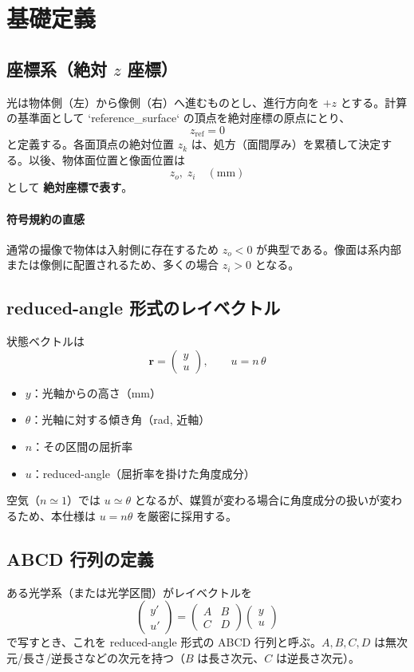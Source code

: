 \section{基礎定義}

\subsection{座標系（絶対 $z$ 座標）}
光は物体側（左）から像側（右）へ進むものとし、進行方向を $+z$ とする。計算の基準面として `reference_surface` の頂点を絶対座標の原点にとり、
\[
z_{\mathrm{ref}} = 0
\]
と定義する。各面頂点の絶対位置 $z_k$ は、処方（面間厚み）を累積して決定する。以後、物体面位置と像面位置は
\[
z_o,\; z_i \quad (\mathrm{mm})
\]
として \textbf{絶対座標で表す}。

\paragraph{符号規約の直感}
通常の撮像で物体は入射側に存在するため $z_o < 0$ が典型である。像面は系内部または像側に配置されるため、多くの場合 $z_i > 0$ となる。

\subsection{reduced-angle 形式のレイベクトル}
状態ベクトルは
\[
\mathbf{r}=\begin{pmatrix}y\\u\end{pmatrix},
\qquad u = n\,\theta
\]
\begin{itemize}
  \item $y$：光軸からの高さ（mm）
  \item $\theta$：光軸に対する傾き角（rad, 近軸）
  \item $n$：その区間の屈折率
  \item $u$：reduced-angle（屈折率を掛けた角度成分）
\end{itemize}
空気（$n\simeq1$）では $u\simeq \theta$ となるが、媒質が変わる場合に角度成分の扱いが変わるため、本仕様は $u=n\theta$ を厳密に採用する。

\subsection{ABCD 行列の定義}
ある光学系（または光学区間）がレイベクトルを
\[
\begin{pmatrix}y'\\u'\end{pmatrix}
=
\begin{pmatrix}A&B\\C&D\end{pmatrix}
\begin{pmatrix}y\\u\end{pmatrix}
\]
で写すとき、これを reduced-angle 形式の ABCD 行列と呼ぶ。$A,B,C,D$ は無次元/長さ/逆長さなどの次元を持つ（$B$ は長さ次元、$C$ は逆長さ次元）。

